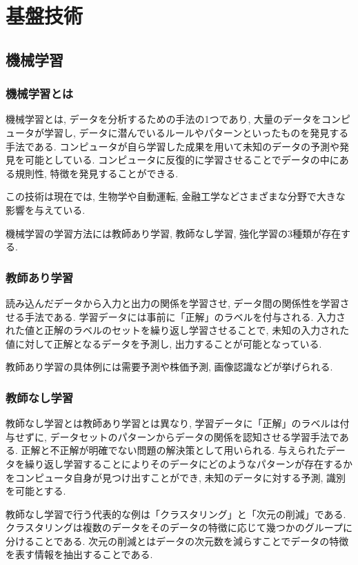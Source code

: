 \chapter{基盤技術}
\label{chap:kibangijyutu}



\section{機械学習}
\subsection{機械学習とは}
機械学習とは, データを分析するための手法の1つであり, 大量のデータをコンピュータが学習し, データに潜んでいるルールやパターンといったものを発見する手法である. コンピュータが自ら学習した成果を用いて未知のデータの予測や発見を可能としている. 
コンピュータに反復的に学習させることでデータの中にある規則性, 特徴を発見することができる. 

この技術は現在では, 生物学や自動運転, 金融工学などさまざまな分野で大きな影響を与えている. 

機械学習の学習方法には教師あり学習, 教師なし学習, 強化学習の3種類が存在する. 

\subsection{教師あり学習}
読み込んだデータから入力と出力の関係を学習させ, データ間の関係性を学習させる手法である. 学習データには事前に「正解」のラベルを付与される. 
入力された値と正解のラベルのセットを繰り返し学習させることで, 未知の入力された値に対して正解となるデータを予測し, 出力することが可能となっている. 

教師あり学習の具体例には需要予測や株価予測, 画像認識などが挙げられる. 

\subsection{教師なし学習}
教師なし学習とは教師あり学習とは異なり, 学習データに「正解」のラベルは付与せずに, データセットのパターンからデータの関係を認知させる学習手法である. 正解と不正解が明確でない問題の解決策として用いられる. 
与えられたデータを繰り返し学習することによりそのデータにどのようなパターンが存在するかをコンピュータ自身が見つけ出すことができ, 未知のデータに対する予測, 識別を可能とする. 

教師なし学習で行う代表的な例は「クラスタリング」と「次元の削減」である. クラスタリングは複数のデータをそのデータの特徴に応じて幾つかのグループに分けることである. 次元の削減とはデータの次元数を減らすことでデータの特徴を表す情報を抽出することである. 

